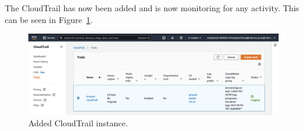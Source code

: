 \clearpage
The CloudTrail has now been added and is now monitoring for any activity.
This can be seen in Figure~\ref{fig:cloudtrail-added}.

\begin{figure}[!htbp]
    \centering
    \includegraphics[width=\textwidth]{resources/cloudtrail/cloudtrail-added}
    \caption{Added CloudTrail instance.}
    \label{fig:cloudtrail-added}
\end{figure}



